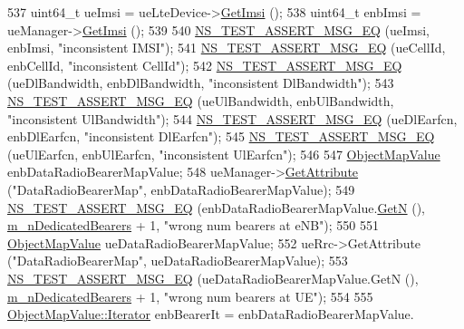 \begin{DoxyCode}
537   uint64\_t ueImsi = ueLteDevice->\hyperlink{classns3_1_1LteUeNetDevice_a673405bfed4b45c5714f17b0c3bad334}{GetImsi} ();
538   uint64\_t enbImsi = ueManager->\hyperlink{classns3_1_1UeManager_a9609913bb407b13da17a55d9013e8e10}{GetImsi} ();
539 
540   \hyperlink{group__testing_ga2a9d78cffb3db8e867c35fff0b698cf5}{NS\_TEST\_ASSERT\_MSG\_EQ} (ueImsi, enbImsi, \textcolor{stringliteral}{"inconsistent IMSI"});
541   \hyperlink{group__testing_ga2a9d78cffb3db8e867c35fff0b698cf5}{NS\_TEST\_ASSERT\_MSG\_EQ} (ueCellId, enbCellId, \textcolor{stringliteral}{"inconsistent CellId"});
542   \hyperlink{group__testing_ga2a9d78cffb3db8e867c35fff0b698cf5}{NS\_TEST\_ASSERT\_MSG\_EQ} (ueDlBandwidth, enbDlBandwidth, \textcolor{stringliteral}{"inconsistent DlBandwidth"});
543   \hyperlink{group__testing_ga2a9d78cffb3db8e867c35fff0b698cf5}{NS\_TEST\_ASSERT\_MSG\_EQ} (ueUlBandwidth, enbUlBandwidth, \textcolor{stringliteral}{"inconsistent UlBandwidth"});
544   \hyperlink{group__testing_ga2a9d78cffb3db8e867c35fff0b698cf5}{NS\_TEST\_ASSERT\_MSG\_EQ} (ueDlEarfcn, enbDlEarfcn, \textcolor{stringliteral}{"inconsistent DlEarfcn"});
545   \hyperlink{group__testing_ga2a9d78cffb3db8e867c35fff0b698cf5}{NS\_TEST\_ASSERT\_MSG\_EQ} (ueUlEarfcn, enbUlEarfcn, \textcolor{stringliteral}{"inconsistent UlEarfcn"});
546 
547   \hyperlink{classns3_1_1ObjectPtrContainerValue}{ObjectMapValue} enbDataRadioBearerMapValue;
548   ueManager->\hyperlink{classns3_1_1ObjectBase_a895d1de2f96063d0e0fd78463e7a7e30}{GetAttribute} (\textcolor{stringliteral}{"DataRadioBearerMap"}, enbDataRadioBearerMapValue);
549   \hyperlink{group__testing_ga2a9d78cffb3db8e867c35fff0b698cf5}{NS\_TEST\_ASSERT\_MSG\_EQ} (enbDataRadioBearerMapValue.\hyperlink{classns3_1_1ObjectPtrContainerValue_a0b282241030189e3f60e76e52d176710}{GetN} (), 
      \hyperlink{classLteX2HandoverMeasuresTestCase_ad17cde512352c02e24f17299705add5c}{m\_nDedicatedBearers} + 1, \textcolor{stringliteral}{"wrong num bearers at eNB"});
550 
551   \hyperlink{classns3_1_1ObjectPtrContainerValue}{ObjectMapValue} ueDataRadioBearerMapValue;
552   ueRrc->GetAttribute (\textcolor{stringliteral}{"DataRadioBearerMap"}, ueDataRadioBearerMapValue);
553   \hyperlink{group__testing_ga2a9d78cffb3db8e867c35fff0b698cf5}{NS\_TEST\_ASSERT\_MSG\_EQ} (ueDataRadioBearerMapValue.GetN (), 
      \hyperlink{classLteX2HandoverMeasuresTestCase_ad17cde512352c02e24f17299705add5c}{m\_nDedicatedBearers} + 1, \textcolor{stringliteral}{"wrong num bearers at UE"});
554 
555   \hyperlink{classns3_1_1ObjectPtrContainerValue_a1f0661f9cf3626d62a4623f36b672876}{ObjectMapValue::Iterator} enbBearerIt = enbDataRadioBearerMapValue.

\end{DoxyCode}
